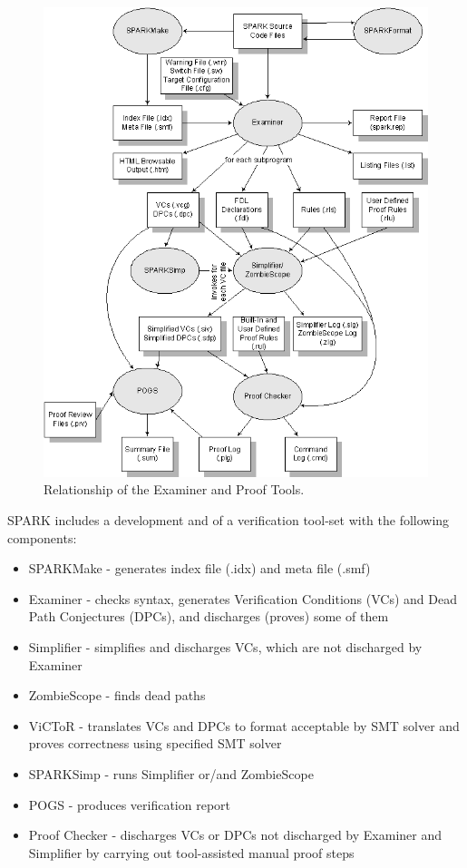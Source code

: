 \begin{figure}[ht]%
    \begin{center}
    	\includegraphics[height=0.6\textheight]{figures/spark-tools.png}    	
    \end{center}
    \caption{Relationship of the Examiner and Proof Tools.\protect\footnotemark}
    \label{figure:spark-tools}
\end{figure}

SPARK includes a development and of a verification tool-set with the following components:
\begin{itemize}
	\item SPARKMake - generates index file (.idx) and meta file (.smf)
	\item Examiner - checks syntax, generates Verification Conditions (VCs) and Dead Path Conjectures (DPCs), and discharges (proves) some of them
	\item Simplifier - simplifies and discharges VCs, which are not discharged by Examiner
	\item ZombieScope - finds dead paths
	\item ViCToR - translates VCs and DPCs to format acceptable by SMT solver and proves correctness using specified SMT solver
	\item SPARKSimp - runs Simplifier or/and ZombieScope
	\item POGS - produces verification report
	\item Proof Checker - discharges VCs or DPCs not discharged by Examiner and Simplifier by carrying out tool-assisted manual proof steps
\end{itemize}


